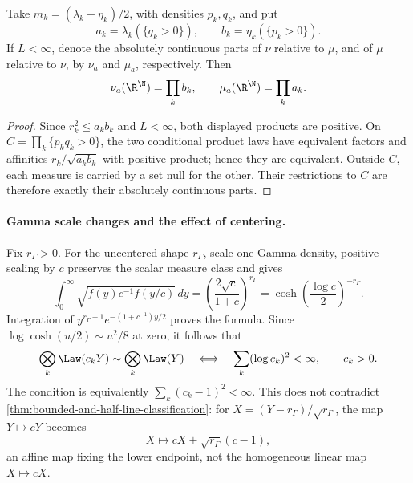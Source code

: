 \begin{corollary}
\label{cor:block-absolutely-continuous-masses}
Take \(m_k=(\lambda_k+\eta_k)/2\), with densities \(p_k,q_k\), and put
\[
 a_k=\lambda_k(\{q_k>0\}),\qquad
 b_k=\eta_k(\{p_k>0\}).
\]
If \(L<\infty\), denote the absolutely continuous parts of \(\nu\)
relative to \(\mu\), and of \(\mu\) relative to \(\nu\), by
\(\nu_a\) and \(\mu_a\), respectively.
Then
\begin{equation}
 \nu_a(\R^\N)=\prod_kb_k,\qquad
 \mu_a(\R^\N)=\prod_ka_k.
 \label{eq:block-ac-part-masses}
\end{equation}
\end{corollary}
\begin{proof}
Since \(r_k^2\leq a_kb_k\) and \(L<\infty\), both displayed products are positive.
On \(C=\prod_k\{p_kq_k>0\}\), the two conditional product laws have
equivalent factors and affinities \(r_k/\sqrt{a_kb_k}\) with positive
product; hence they are equivalent.
Outside \(C\), each measure is carried by a set null for the other.
Their restrictions to \(C\) are therefore exactly their absolutely
continuous parts.
\end{proof}

\paragraph{Gamma scale changes and the effect of centering.}
Fix \(r_\Gamma>0\).  For the uncentered shape-\(r_\Gamma\), scale-one
Gamma density, positive
scaling by \(c\) preserves the scalar measure class and gives
\begin{equation}
  \int_0^\infty\sqrt{f(y)c^{-1}f(y/c)}\,dy
 =\left(\frac{2\sqrt c}{1+c}\right)^{r_\Gamma}
 =\cosh\!\left(\frac{\log c}{2}\right)^{-r_\Gamma}.
 \label{eq:gamma-scale-affinity}
\end{equation}
Integration of \(y^{r_\Gamma-1}e^{-(1+c^{-1})y/2}\) proves the formula.
Since \(\log\cosh(u/2)\sim u^2/8\) at zero, it follows that
\begin{equation}
 \bigotimes_k\Law(c_kY)\sim\bigotimes_k\Law(Y)
 \quad\Longleftrightarrow\quad
 \sum_k(\log c_k)^2<\infty,
 \qquad c_k>0.
 \label{eq:gamma-scale-product-equivalence}
\end{equation}
The condition is equivalently \(\sum_k(c_k-1)^2<\infty\).
This does not contradict \cref{thm:bounded-and-half-line-classification}:
for \(X=(Y-r_\Gamma)/\sqrt{r_\Gamma}\), the map \(Y\mapsto cY\) becomes
\[
 X\longmapsto cX+\sqrt{r_\Gamma}(c-1),
\]
an affine map fixing the lower endpoint, not the homogeneous
linear map \(X\mapsto cX\).

